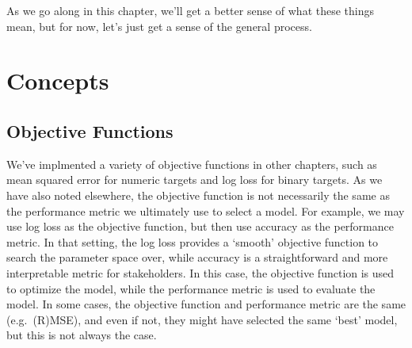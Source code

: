 \documentclass[
  letterpaper,
]{krantz}
\begin{document}
As we go along in this chapter, we'll get a better sense of what these
things mean, but for now, let's just get a sense of the general process.

\section{Concepts}\label{concepts}

\subsection{Objective Functions}\label{objective-functions}

We've implmented a variety of objective functions in other chapters,
such as mean squared error for numeric targets and log loss for binary
targets. As we have also noted elsewhere, the objective function is not
necessarily the same as the performance metric we ultimately use to
select a model. For example, we may use log loss as the objective
function, but then use accuracy as the performance metric. In that
setting, the log loss provides a `smooth' objective function to search
the parameter space over, while accuracy is a straightforward and more
interpretable metric for stakeholders. In this case, the objective
function is used to optimize the model, while the performance metric is
used to evaluate the model. In some cases, the objective function and
performance metric are the same (e.g.~(R)MSE), and even if not, they
might have selected the same `best' model, but this is not always the
case.
\end{document}
